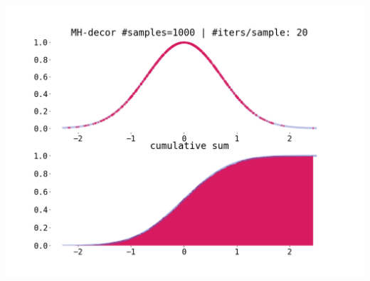 \documentclass[titlepage]{article}
\begin{document}
\includegraphics[width=\textwidth]{mcmc-mh-uncorr-1d-exp.png}
\end{document}

